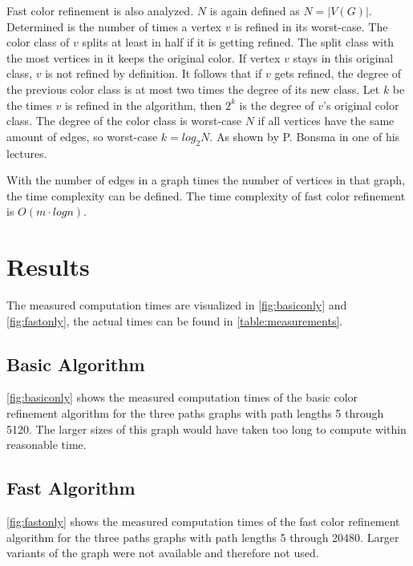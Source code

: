 \documentclass[twoside]{article}
\begin{document}
\begin{multicols}{2}
Fast color refinement is also analyzed. $N$ is again defined as $N=|V(G)|$. Determined is the number of times a vertex $v$ is refined in its worst-case. The color class of $v$ splits at least in half if it is getting refined. The split class with the most vertices in it keeps the original color. If vertex $v$ stays in this original class, $v$ is not refined by definition. It follows that if $v$ gets refined, the degree of the previous color class is at most two times the degree of its new class. Let $k$ be the times $v$ is refined in the algorithm, then $2^k$ is the degree of $v$'s original color class.  The degree of the color class is worst-case $N$ if all vertices have the same amount of edges, so worst-case $k=log_2 N$. As shown by P. Bonsma in one of his lectures. \cite{presentation:slidesPartIII}

With the number of edges in a graph times the number of vertices in that graph, the time complexity can be defined.\cite{presentation:slidesPartIII} The time complexity of fast color refinement is $O(m\cdot log n)$. 

\section{Results}
\label{results}
The measured computation times are visualized in \autoref{fig:basiconly} and \autoref{fig:fastonly}, the actual times can be found in \autoref{table:measurements}.

\subsection{Basic Algorithm}
\autoref{fig:basiconly} shows the measured computation times of the basic color refinement algorithm for the three paths graphs with path lengths 5 through 5120. The larger sizes of this graph would have taken too long to compute within reasonable time.

\subsection{Fast Algorithm}
\autoref{fig:fastonly} shows the measured computation times of the fast color refinement algorithm for the three paths graphs with path lengths 5 through 20480. Larger variants of the graph were not available and therefore not used.


\end{multicols}
\end{document}
